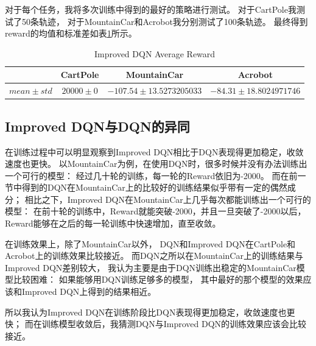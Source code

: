 \documentclass[a4paper,UTF8]{article}
\theoremstyle{definition}
\begin{document}
对于每个任务，我将多次训练中得到的最好的策略进行测试。
对于CartPole我测试了50条轨迹，
对于MountainCar和Acrobot我分别测试了100条轨迹。
最终得到reward的均值和标准差如表\ref{tab:reward-idqn}所示。

\begin{table}[H]
	\centering
	\caption{Improved DQN Average Reward}\label{tab:reward-idqn}
	\begin{tabular}{c|ccc}
		\toprule
		& CartPole & MountainCar & Acrobot \\
		\midrule
		$mean \pm std$ & $20000 \pm 0$ & $-107.54 \pm 13.5273205033$ & $-84.31 \pm 18.8024971746$ \\
		\bottomrule
	\end{tabular}
\end{table}

\subsection*{Improved DQN与DQN的异同}

在训练过程中可以明显观察到Improved DQN相比于DQN表现得更加稳定，收敛速度也更快。
以MountainCar为例，在使用DQN时，很多时候并没有办法训练出一个可行的模型：
经过几十轮的训练，每一轮的Reward依旧为-2000。
而在前一节中得到的DQN在MountainCar上的比较好的训练结果似乎带有一定的偶然成分；
相比之下，Improved DQN在MountainCar上几乎每次都能训练出一个可行的模型：
在前十轮的训练中，Reward就能突破-2000，并且一旦突破了-2000以后，
Reward能够在之后的每一轮训练中快速增加，直至收敛。

在训练效果上，除了MountainCar以外，
DQN和Improved DQN在CartPole和Acrobot上的训练效果比较接近。
而DQN之所以在MountainCar上的训练结果与Improved DQN差别较大，
我认为主要是由于DQN训练出稳定的MountainCar模型比较困难：
如果能够用DQN训练足够多的模型，
其中最好的那个模型的效果应该和Improved DQN上得到的结果相近。

所以我认为Improved DQN在训练阶段比DQN表现得更加稳定，收敛速度也更快；
而在训练模型收敛后，我猜测DQN与Improved DQN的训练效果应该会比较接近。

\nocite{*}

\end{document}
